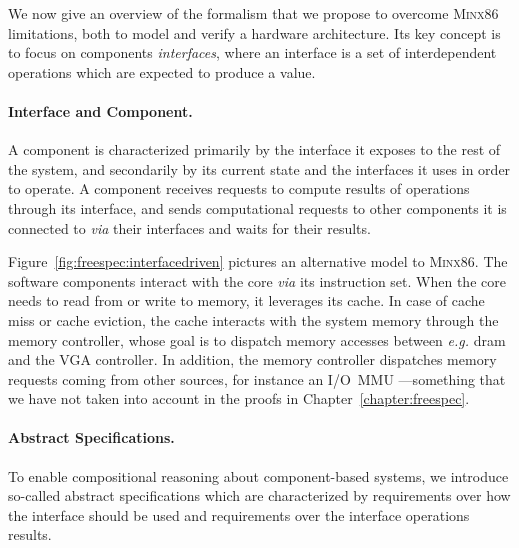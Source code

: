 We now give an overview of the formalism that we propose to overcome {\scshape
  Minx86} limitations, both to model and verify a hardware architecture.
%
Its key concept is to focus on components \emph{interfaces}, where an interface
is a set of interdependent operations which are expected to produce a value.

\paragraph{Interface and Component.}
%
A component is characterized primarily by the interface it exposes to the rest
of the system, and secondarily by its current state and the interfaces it uses
in order to operate.
%
A component receives requests to compute results of operations through its
interface, and sends computational  requests to other components it is connected to
\emph{via} their interfaces and waits for their results.

\begin{example}
  \label{example:freespec:compoattack}

  Figure~\ref{fig:freespec:interfacedriven} pictures an alternative model to
  {\scshape Minx86}.
  The software components interact with the core \emph{via} its instruction
  set.
  When the core needs to read from or write to memory, it leverages its cache.
  In case of cache miss or cache eviction, the cache interacts with the system
  memory through the memory controller, whose goal is to dispatch memory
  accesses between \emph{e.g.} \ac{dram} and the VGA controller.
  In addition, the memory controller dispatches memory requests coming from
  other sources, for instance an I/O~MMU ---something that we have not taken
  into account in the proofs in Chapter~\ref{chapter:freespec}.
\end{example}

\paragraph{Abstract Specifications.}
%
To enable compositional reasoning about component-based systems, we introduce
so-called abstract specifications which are characterized by requirements over
how the interface should be used and requirements over the interface operations
results.

